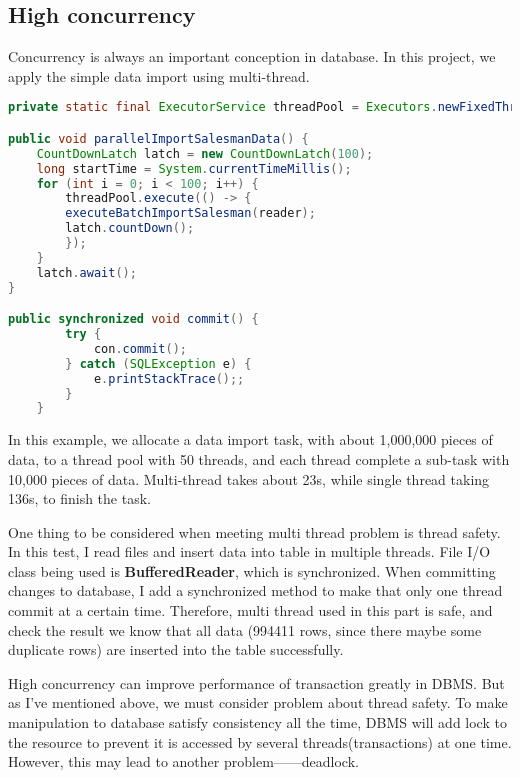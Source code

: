 \documentclass[onecolumn, oneside, ctexart, UTF8, b4paper]{SUSTechHomework}
\newcommand{\upcite}[1]{\textsuperscript{\textsuperscript{\cite{#1}}}}
\begin{document}
\subsection{\textbf{High concurrency}}

Concurrency is always an important conception in database. In this project, we apply the simple data import using multi-thread.

\begin{lstlisting}[language=Java]
private static final ExecutorService threadPool = Executors.newFixedThreadPool(50);

public void parallelImportSalesmanData() {
    CountDownLatch latch = new CountDownLatch(100);
    long startTime = System.currentTimeMillis();
    for (int i = 0; i < 100; i++) {
        threadPool.execute(() -> {
        executeBatchImportSalesman(reader);
        latch.countDown();
        });
    }
    latch.await();
}

public synchronized void commit() {
        try {
            con.commit();
        } catch (SQLException e) {
            e.printStackTrace();;
        }
    }
\end{lstlisting}

In this example, we allocate a data import task, with about 1,000,000 pieces of data, to a thread pool with 50 threads, and each thread complete a sub-task with 10,000 pieces of data. Multi-thread takes about 23s, while single thread taking 136s, to finish the task.

One thing to be considered when meeting multi thread problem is thread safety. In this test, I read files and insert data into table in multiple threads. File I/O class being used is \textbf{BufferedReader}, which is synchronized\upcite{ref2}. When committing changes to database, I add a synchronized method to make that only one thread commit at a certain time. Therefore, multi thread used in this part is safe, and check the result we know that all data (994411 rows, since there maybe some duplicate rows) are inserted into the table successfully.

High concurrency can improve performance of transaction greatly in DBMS. But as I've mentioned above, we must consider problem about thread safety. To make manipulation to database satisfy consistency all the time, DBMS will add lock to the resource to prevent it is accessed by several threads(transactions) at one time. However, this may lead to another problem——deadlock.

\begin{figure}[H]
\centering
{}
\end{figure}
\end{document}
